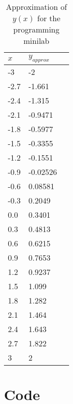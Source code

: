 \documentclass[12pt]{article}
\begin{document}
\begin{table}[hp]
  \centering
  \begin{tabularx}{.5\textwidth}{XXX}
    \hline
    $x$ & $y_{approx}$ \\
    \hline
    -3   &        -2    \\
    -2.7   &    -1.661  \\
    -2.4   &    -1.315  \\
    -2.1   &   -0.9471  \\
    -1.8   &   -0.5977  \\
    -1.5   &   -0.3355  \\
    -1.2   &   -0.1551  \\
    -0.9   &  -0.02526  \\
    -0.6   &   0.08581  \\
    -0.3   &    0.2049  \\
    0.0   &    0.3401   \\
    0.3   &    0.4813   \\
    0.6   &    0.6215  \\
    0.9   &    0.7653  \\
    1.2   &    0.9237  \\
    1.5   &     1.099  \\
    1.8   &     1.282  \\
    2.1   &     1.464  \\
    2.4   &     1.643  \\
    2.7   &     1.822  \\
    3   &         2  \\
    \hline           
  \end{tabularx}
  \caption{Approximation of $y(x)$ for the programming minilab}
  \label{tab:minilab_data}
\end{table}

\pagebreak
\section{Code}
  
  
  
\end{document}
